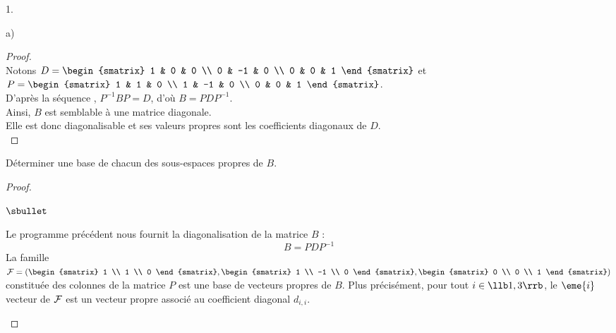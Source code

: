 \begin{noliste}{1.}
\begin{noliste}{a)}
    \begin{proof}~\\[.2cm]
      Notons $D = 
      \begin{smatrix} 
        1 & 0 & 0 \\ 
        0 & -1 & 0 \\ 
        0 & 0 & 1
      \end{smatrix}$ et $P = 
      \begin{smatrix} 
        1 & 1 & 0 \\ 
        1 & -1 & 0 \\ 
        0 & 0 & 1
      \end{smatrix}$.\\[.2cm]
      D'après la séquence \Scilab{}, $P^{-1}BP = D$, d'où $B =
      PDP^{-1}$. \\
      Ainsi, $B$ est semblable à une matrice diagonale.\\
      Elle est donc diagonalisable et ses valeurs propres sont les
      coefficients diagonaux de $D$. %
      ~\\[-1cm]
    \end{proof}
   	
  \item Déterminer une base de chacun des sous-espaces propres de $B$.
   	
    \begin{proof}~%
      \begin{noliste}{$\sbullet$}
      \item Le programme \Scilab{} précédent nous fournit la
        diagonalisation de la matrice $B$ :
        \[
        B = PDP^{-1}
        \]
        La famille ${\cal F} = \left(
          \begin{smatrix}
            1 \\
            1 \\
            0
          \end{smatrix},
          \begin{smatrix}
            1 \\
            -1 \\
            0
          \end{smatrix},
          \begin{smatrix}
            0 \\
            0 \\
            1
          \end{smatrix}\right)$ constituée des colonnes de la matrice
        $P$ est une base de vecteurs propres de $B$. Plus
        précisément, pour tout $i \in \llb 1, 3 \rrb$, le $\eme{i}$
        vecteur de ${\cal F}$ est un vecteur propre associé au
        coefficient diagonal $d_{i,i}$.


\end{noliste}
\end{proof}
\end{noliste}
\end{noliste}
